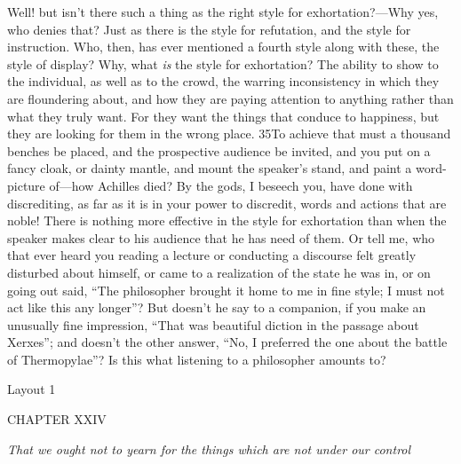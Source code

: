 Well! but isn't there such a thing as the right style for exhortation?—Why yes, who denies that? Just as there is the style for refutation, and the style for instruction. Who, then, has ever mentioned a fourth style along with these, the style of display? Why, what \emph{is} the style for exhortation? The ability to show to the individual, as well as to the crowd, the warring inconsistency in which they are floundering about, and how they are paying attention to anything rather than what they truly want. For they want the things that conduce to happiness, but they are looking for them in the wrong place. 35To achieve that must a thousand benches be placed, and the prospective audience be invited, and you put on a fancy cloak, or dainty mantle, and mount the speaker's stand, and paint a word-picture of—how Achilles died? By the gods, I beseech you, have done with discrediting, as far as it is in your power to discredit, words and actions that are noble! There is nothing more effective in the style for exhortation than when the speaker makes clear to his audience that he has need of them. Or tell me, who that ever heard you reading a lecture or conducting a discourse felt greatly disturbed about himself, or came to a realization of the state he was in, or on going out said, ``The philosopher brought it home to me in fine style; I must not act like this any longer''? But doesn't he say to a companion, if you make an unusually fine impression, ``That was beautiful diction in the passage about Xerxes''; and doesn't the other answer, ``No, I preferred the one about the battle of Thermopylae''? Is this what listening to a philosopher amounts to?



Layout 1

CHAPTER XXIV

\emph{That we ought not to yearn for the things which are not under our control}

